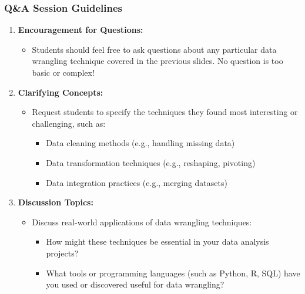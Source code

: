 \documentclass[aspectratio=169]{beamer}
\begin{document}
\begin{frame}[fragile]
    \frametitle{Q\&A Session Guidelines}
    \begin{enumerate}
        \item \textbf{Encouragement for Questions:}
            \begin{itemize}
                \item Students should feel free to ask questions about any particular data wrangling technique covered in the previous slides. No question is too basic or complex!
            \end{itemize}
        \item \textbf{Clarifying Concepts:}
            \begin{itemize}
                \item Request students to specify the techniques they found most interesting or challenging, such as:
                    \begin{itemize}
                        \item Data cleaning methods (e.g., handling missing data)
                        \item Data transformation techniques (e.g., reshaping, pivoting)
                        \item Data integration practices (e.g., merging datasets)
                    \end{itemize}
            \end{itemize}
        \item \textbf{Discussion Topics:}
            \begin{itemize}
                \item Discuss real-world applications of data wrangling techniques:
                \begin{itemize}
                    \item How might these techniques be essential in your data analysis projects?
                    \item What tools or programming languages (such as Python, R, SQL) have you used or discovered useful for data wrangling?
                \end{itemize}
            \end{itemize}
    \end{enumerate}
\end{frame}
\end{document}
